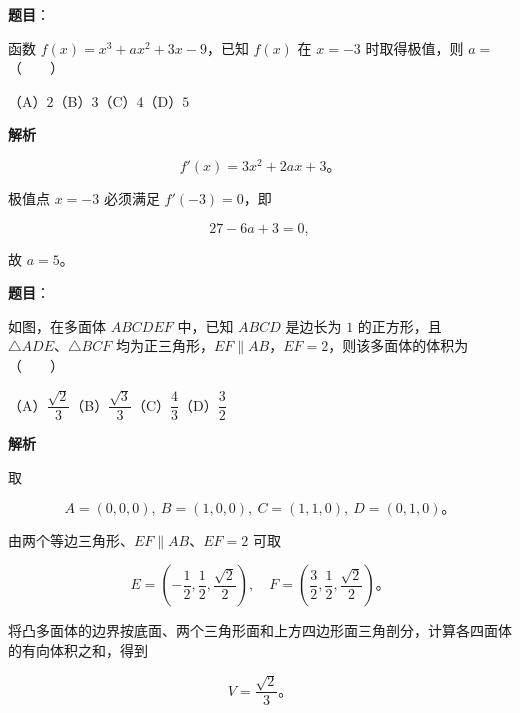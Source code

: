 \begin{answer}

\textbf{题目}：

函数 $f(x)=x^3+ax^2+3x-9$，已知 $f(x)$ 在 $x=-3$ 时取得极值，则 $a=$\mbox{（　　）}

（A）$2$\quad（B）$3$\quad（C）$4$\quad（D）$5$

\textbf{解析}

\nopagebreak[4]
\[
f'(x)=3x^2+2ax+3\text{。}
\]

极值点 $x=-3$ 必须满足 $f'(-3)=0$，即

\nopagebreak[4]
\[
27-6a+3=0,
\]

故 $a=5$。


\end{answer}
\begin{answer}

\textbf{题目}：

如图，在多面体 $ABCDEF$ 中，已知 $ABCD$ 是边长为 $1$ 的正方形，且 $\triangle ADE\text{、}\triangle BCF$ 均为正三角形，$EF\parallel AB$，$EF=2$，则该多面体的体积为\mbox{（　　）}
\nopagebreak[4]
\begin{center}\end{center}
\nopagebreak[4]
（A）$\dfrac{\sqrt2}{3}$\quad（B）$\dfrac{\sqrt3}{3}$\quad（C）$\dfrac43$\quad（D）$\dfrac32$

\textbf{解析}

取

\nopagebreak[4]
\[
A=(0,0,0),\ B=(1,0,0),\ C=(1,1,0),\ D=(0,1,0)\text{。}
\]

由两个等边三角形、$EF\parallel AB$、$EF=2$ 可取

\nopagebreak[4]
\[
E=\left(-\frac12,\frac12,\frac{\sqrt2}{2}\right),\quad
F=\left(\frac32,\frac12,\frac{\sqrt2}{2}\right)\text{。}
\]

将凸多面体的边界按底面、两个三角形面和上方四边形面三角剖分，计算各四面体的有向体积之和，得到

\nopagebreak[4]
\[
V=\frac{\sqrt2}{3}\text{。}
\]


\end{answer}
